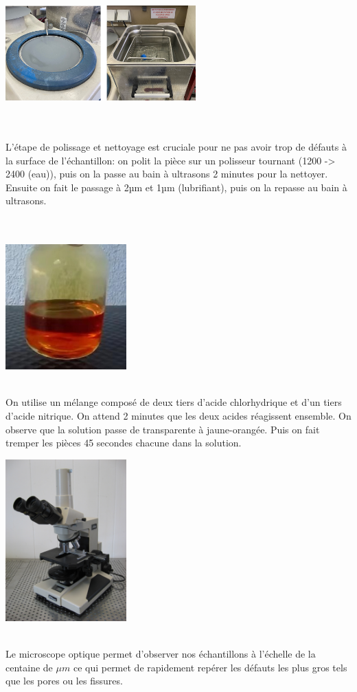 \centerline{\includegraphics[width=0.55\textwidth]{images/WechatIMG1126.jpeg}}

\\\\
L'étape de polissage et nettoyage est cruciale pour ne pas avoir 
trop de défauts à la surface de l'échantillon:
on polit la pièce sur un polisseur tournant (1200 -> 2400 (eau)), puis on la passe au bain à ultrasons 2 minutes pour la nettoyer.
Ensuite on fait le passage à 2µm et 1µm (lubrifiant),
puis on la repasse au bain à ultrasons.\\
\\
\\
\centerline{\includegraphics[width=0.35\textwidth]{images/WechatIMG1128.jpeg}}
\\
On utilise un mélange composé de deux tiers d'acide chlorhydrique 
et d'un tiers d'acide nitrique.
On attend 2 minutes que les deux acides réagissent ensemble.
On observe que la solution passe de transparente à jaune-orangée.
Puis on fait tremper les pièces 45 secondes chacune dans la solution.
\\

\centerline{\includegraphics[width=0.35\textwidth]{images/optique.jpg}}
\\
Le microscope optique permet d'observer nos échantillons à l'échelle de la centaine de $\mu m$ ce qui permet de rapidement repérer les défauts les plus gros tels que les pores ou les fissures.
\\

